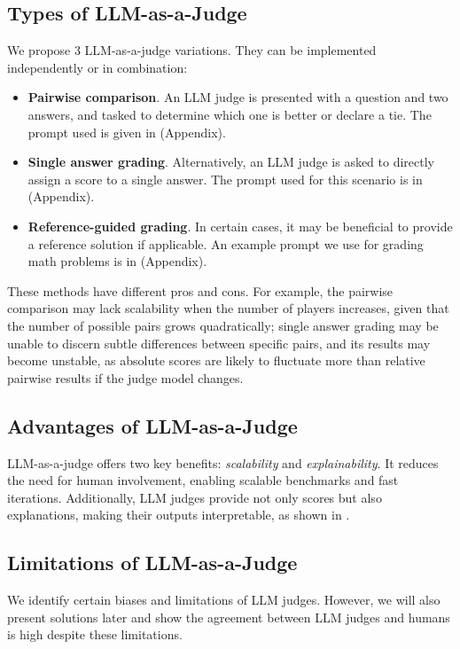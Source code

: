 \subsection{Types of LLM-as-a-Judge}
We propose 3 LLM-as-a-judge variations. They can be implemented independently or in combination:
\begin{itemize}
\item \textbf{Pairwise comparison}. An LLM judge is presented with a question and two answers, and tasked to determine which one is better or declare a tie. The prompt used is given in  (Appendix).
\item \textbf{Single answer grading}.
Alternatively, an LLM judge is asked to directly assign a score to a single answer. The prompt used for this scenario is in  (Appendix).
\item \textbf{Reference-guided grading}.
In certain cases, it may be beneficial to provide a reference solution if applicable. An example prompt we use for grading math problems is in  (Appendix).
\end{itemize}

These methods have different pros and cons. For example, the pairwise comparison may lack scalability when the number of players increases, given that the number of possible pairs grows quadratically; single answer grading may be unable to discern subtle differences between specific pairs, and its results may become unstable, as absolute scores are likely to fluctuate more than relative pairwise results if the judge model changes.

\subsection{Advantages of LLM-as-a-Judge}
LLM-as-a-judge offers two key benefits: \textit{scalability} and \textit{explainability}. It reduces the need for human involvement, enabling scalable benchmarks and fast iterations. Additionally, LLM judges provide not only scores but also explanations, making their outputs interpretable, as shown in .

\subsection{Limitations of LLM-as-a-Judge}
\label{subsec:llmlimit}

We identify certain biases and limitations of LLM judges. However, we will also present solutions later and show the agreement between LLM judges and humans is high despite these limitations.

